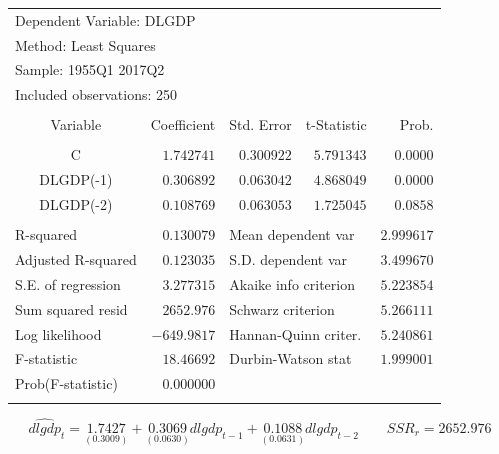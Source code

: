 \documentclass[12pt]{report}
\begin{document}
\begin{table}[H]
	\centering
	\begin{tabular}{lrrrr}
		\multicolumn{3}{l}{Dependent Variable: DLGDP}&\multicolumn{1}{c}{}&\multicolumn{1}{c}{}\\
		\multicolumn{3}{l}{Method: Least Squares}&\multicolumn{1}{c}{}&\multicolumn{1}{c}{}\\
		\multicolumn{3}{l}{Sample: 1955Q1 2017Q2}&\multicolumn{1}{c}{}&\multicolumn{1}{c}{}\\
		\multicolumn{3}{l}{Included observations: 250}&\multicolumn{1}{c}{}&\multicolumn{1}{c}{}\\
		[4.5pt] \hline \\ [-4.5pt]
		\multicolumn{1}{c}{Variable}&\multicolumn{1}{r}{Coefficient}&\multicolumn{1}{r}{Std. Error}&\multicolumn{1}{r}{t-Statistic}&\multicolumn{1}{r}{Prob.}\\
		[4.5pt] \hline \\ [-4.5pt]
		\multicolumn{1}{c}{C}&\multicolumn{1}{r}{$1.742741$}&\multicolumn{1}{r}{$0.300922$}&\multicolumn{1}{r}{$5.791343$}&\multicolumn{1}{r}{$0.0000$}\\
		\multicolumn{1}{c}{DLGDP(-1)}&\multicolumn{1}{r}{$0.306892$}&\multicolumn{1}{r}{$0.063042$}&\multicolumn{1}{r}{$4.868049$}&\multicolumn{1}{r}{$0.0000$}\\
		\multicolumn{1}{c}{DLGDP(-2)}&\multicolumn{1}{r}{$0.108769$}&\multicolumn{1}{r}{$0.063053$}&\multicolumn{1}{r}{$1.725045$}&\multicolumn{1}{r}{$0.0858$}\\
		[4.5pt] \hline \\ [-4.5pt]
		\multicolumn{1}{l}{R-squared}&\multicolumn{1}{r}{$0.130079$}&\multicolumn{2}{l}{Mean dependent var}&\multicolumn{1}{r}{$2.999617$}\\
		\multicolumn{1}{l}{Adjusted R-squared}&\multicolumn{1}{r}{$0.123035$}&\multicolumn{2}{l}{S.D. dependent var}&\multicolumn{1}{r}{$3.499670$}\\
		\multicolumn{1}{l}{S.E. of regression}&\multicolumn{1}{r}{$3.277315$}&\multicolumn{2}{l}{Akaike info criterion}&\multicolumn{1}{r}{$5.223854$}\\
		\multicolumn{1}{l}{Sum squared resid}&\multicolumn{1}{r}{$2652.976$}&\multicolumn{2}{l}{Schwarz criterion}&\multicolumn{1}{r}{$5.266111$}\\
		\multicolumn{1}{l}{Log likelihood}&\multicolumn{1}{r}{$-649.9817$}&\multicolumn{2}{l}{Hannan-Quinn criter.}&\multicolumn{1}{r}{$5.240861$}\\
		\multicolumn{1}{l}{F-statistic}&\multicolumn{1}{r}{$18.46692$}&\multicolumn{2}{l}{Durbin-Watson stat}&\multicolumn{1}{r}{$1.999001$}\\
		\multicolumn{1}{l}{Prob(F-statistic)}&\multicolumn{1}{r}{$0.000000$}&\multicolumn{1}{c}{}&\multicolumn{1}{c}{}&\multicolumn{1}{c}{}\\
		[4.5pt] \hline \\ [-4.5pt]
	\end{tabular}
	$$\widehat{dlgdp}_t = \underset{(0.3009)}{1.7427} + \underset{(0.0630)}{0.3069}dlgdp_{t-1} + \underset{(0.0631)}{0.1088}dlgdp_{t-2} \qquad SSR_r = 2652.976$$
\end{table}
\end{document}
